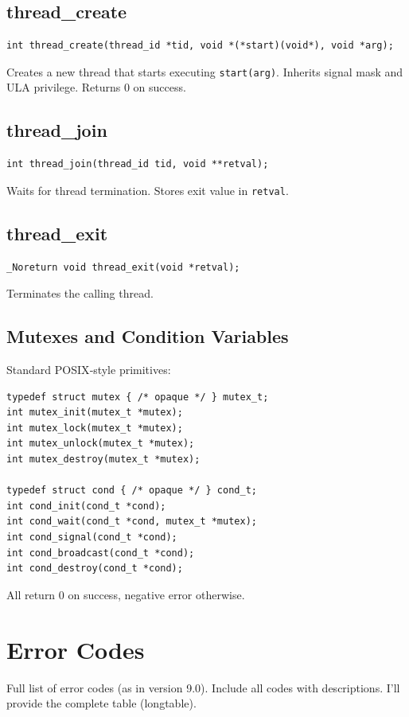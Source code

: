 \documentclass[12pt,a4paper]{article}
\begin{document}
\subsection{thread\_create}
\begin{lstlisting}
int thread_create(thread_id *tid, void *(*start)(void*), void *arg);
\end{lstlisting}
Creates a new thread that starts executing \texttt{start(arg)}. Inherits signal mask and ULA privilege. Returns 0 on success.

\subsection{thread\_join}
\begin{lstlisting}
int thread_join(thread_id tid, void **retval);
\end{lstlisting}
Waits for thread termination. Stores exit value in \texttt{retval}.

\subsection{thread\_exit}
\begin{lstlisting}
_Noreturn void thread_exit(void *retval);
\end{lstlisting}
Terminates the calling thread.

\subsection{Mutexes and Condition Variables}
Standard POSIX‑style primitives:
\begin{lstlisting}
typedef struct mutex { /* opaque */ } mutex_t;
int mutex_init(mutex_t *mutex);
int mutex_lock(mutex_t *mutex);
int mutex_unlock(mutex_t *mutex);
int mutex_destroy(mutex_t *mutex);

typedef struct cond { /* opaque */ } cond_t;
int cond_init(cond_t *cond);
int cond_wait(cond_t *cond, mutex_t *mutex);
int cond_signal(cond_t *cond);
int cond_broadcast(cond_t *cond);
int cond_destroy(cond_t *cond);
\end{lstlisting}
All return 0 on success, negative error otherwise.

\section{Error Codes}
\label{sec:errors}

Full list of error codes (as in version 9.0). Include all codes with descriptions. I'll provide the complete table (longtable).
\end{document}
